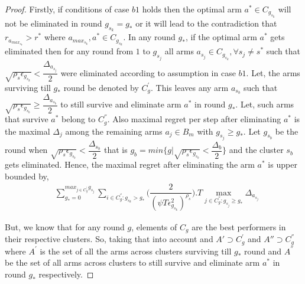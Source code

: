 \begin{proof}
	Firstly, if conditions of case $b1$ holds then the optimal arm $a^{*}\in C_{g_{s_{k}}}$ will not be eliminated in round $g_{s_{k}}=g_{*}$ or it will lead to the contradiction that $r_{a_{max_{s_{k}}}}>r^{*}$ where $a_{max_{s_{k}}},a^{*}\in C_{g_{s_{k}}}$. In any round $g_{*}$, if the optimal arm $a^{*}$ gets eliminated then for any round from $1$ to $g_{s_{j}}$ all arms $a_{s_{j}}\in C_{g_{s_{k}}},\forall s_{j}\neq s^{*}$ such that $\sqrt{\rho_{s}\epsilon_{g_{s_{k}}}}<\dfrac{\Delta_{a_{s_{j}}}}{2}$ were eliminated according to assumption in case $b1$. Let, the arms surviving till $g_{*}$ round be denoted by $C_{g}^{'}$. This leaves any arm $a_{s_{b}}$ such that $\sqrt{\rho_{s}\epsilon_{g_{s_{b}}}}\geq\dfrac{\Delta_{a_{s_{b}}}}{2}$ to still survive and eliminate arm $a^{*}$ in round $g_{*}$. Let, such arms that survive $a^{*}$ belong to $C_{g}^{''}$. Also maximal regret per step after eliminating $a^{*}$ is the maximal $\Delta_{j}$ among the remaining arms $a_{j}\in B_{m}$ with $g_{s_{j}}\geq g_{
*}$.  Let $g_{s_{b}}$ be the round when $\sqrt{\rho_{s}\epsilon_{g_{s_{b}}}}<\dfrac{\Delta_{s_{b}}}{2}$ that is $g_{b}=min\lbrace g|\sqrt{\rho_{s}\epsilon_{g_{s_{b}}}}<\dfrac{\Delta_{b}}{2}\rbrace$ and the cluster $s_{b}$ gets eliminated. Hence, the maximal regret after eliminating the arm $a^{*}$ is upper bounded by, 
 \begin{align*}
 &\sum_{g_{*}=0}^{max_{j\in C_{g}^{'}}g_{s_{j}}}\sum_{i\in C_{g}^{''}:g_{s_{k}}>g_{*}}\bigg(\dfrac{2}{(\psi T\epsilon_{g_{s_{k}}}^{2})^{\rho_{s}}} \bigg).T\max_{j\in C_{g}^{''}:g_{s_{j}}\geq g_{*}}{\Delta}_{a_{s_{j}}}
 \end{align*}
 
But, we know that for any round $g$, elements of $C_{g}$ are the best performers in their respective clusters. So, taking that into account and $A'\supset C_{g}^{'}$ and $A''\supset C_{g}^{''}$ where $A^{'}$ is the set of all the arms across clusters surviving till $g_{*}$ round and $A^{''}$ be the set of all arms across clusters to still survive and eliminate arm $a^{*}$ in round $g_{*}$ respectively. 


\end{proof}
